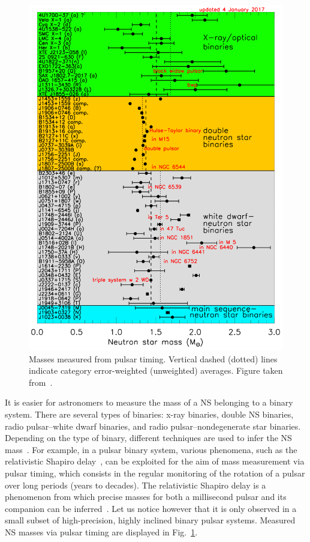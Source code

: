\begin{figure}[!t]
\begin{center}
  \includegraphics[width=0.7\linewidth]{figures/masses.png}
\end{center}
\caption[Masses measured from pulsar timing]{Masses 
measured from pulsar timing. Vertical dashed (dotted) lines indicate category 
error-weighted (unweighted) averages. Figure taken 
from~\cite{Lattimer2019}.}\label{fig:masses_lattimer}
\end{figure}
%
It is easier for astronomers to measure the mass of a NS belonging to a binary 
system. There are several types of binaries: x-ray binaries, double NS 
binaries, radio pulsar--white dwarf binaries, and radio pulsar--nondegenerate 
star binaries. Depending on the type of binary, different techniques are used 
to infer the NS mass~\cite{Haensel2007}.
For example, in a pulsar binary system, various phenomena, such as the 
relativistic Shapiro delay~\cite{Shapiro1964}, can be exploited for the aim of
mass measurement via pulsar timing, which consists in the regular monitoring of 
the rotation of a pulsar over long periods (years to decades). The relativistic 
Shapiro delay is a phenomenon from which precise masses for both a millisecond 
pulsar and its companion can be inferred~\cite{Demorest2010,Cromartie2020}. Let 
us notice however that it is only observed in a small subset of high-precision, 
highly inclined binary pulsar systems. Measured NS masses via pulsar timing are
displayed in Fig.~\ref{fig:masses_lattimer}. 


